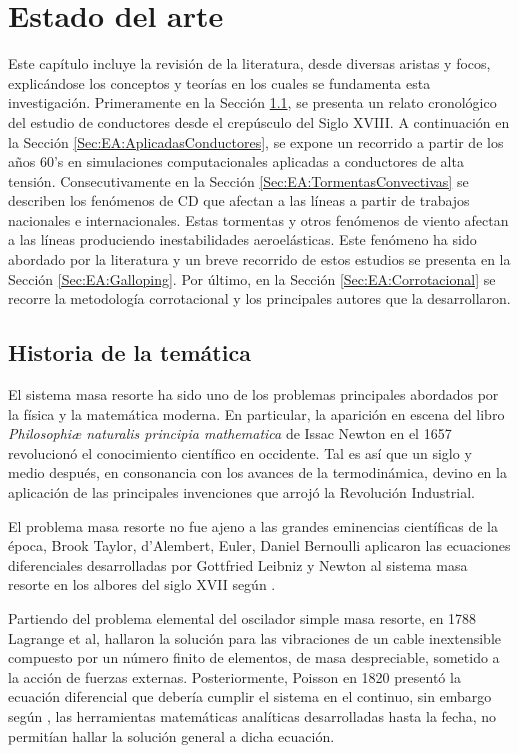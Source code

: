 \chapter{Estado del arte}\label{Cap:EstadoDelArte}\linenumbers

Este capítulo incluye la revisión de la literatura, desde diversas aristas y focos, explicándose los conceptos y teorías en los cuales se fundamenta esta investigación. Primeramente en la Sección \ref{Sec:EA:Historia}, se presenta un relato cronológico del estudio de conductores desde el crepúsculo del Siglo XVIII. A continuación en la Sección \ref{Sec:EA:AplicadasConductores}, se expone un recorrido a partir de los años 60's en simulaciones computacionales aplicadas a conductores de alta tensión. Consecutivamente en la Sección \ref{Sec:EA:TormentasConvectivas} se describen los fenómenos de CD que afectan a las líneas a partir de trabajos nacionales e internacionales. Estas tormentas y otros fenómenos de viento afectan a las líneas produciendo inestabilidades aeroelásticas. Este fenómeno ha sido abordado por la literatura y un breve recorrido de estos estudios se presenta en la Sección \ref{Sec:EA:Galloping}. Por último, en la Sección \ref{Sec:EA:Corrotacional} se recorre la metodología corrotacional y los principales autores que la desarrollaron. 

\section{Historia de la temática}\label{Sec:EA:Historia}
El sistema masa resorte ha sido uno de los problemas principales abordados por la física y la matemática moderna. En particular, la aparición en escena del libro \emph{Philosophiæ naturalis principia mathematica} de Issac Newton en el 1657 revolucionó el conocimiento científico en occidente. Tal es así que un siglo y medio después, en consonancia con los avances de la termodinámica, devino en la aplicación de las principales invenciones que arrojó la Revolución Industrial.

El problema masa resorte no fue ajeno a las grandes eminencias científicas de la época, Brook Taylor, d'Alembert, Euler, Daniel Bernoulli aplicaron las ecuaciones diferenciales desarrolladas por Gottfried Leibniz y Newton al sistema masa resorte en los albores del siglo XVII según \cite{Starossek1991}.  

Partiendo del problema elemental del oscilador simple masa resorte, en 1788 Lagrange et al, hallaron la solución para las vibraciones de un cable inextensible compuesto por un número finito de elementos, de masa despreciable, sometido a la acción de fuerzas externas. Posteriormente, Poisson en 1820 presentó la ecuación diferencial que debería cumplir el sistema en el continuo, sin embargo según \cite{Irvine1974}, las herramientas matemáticas analíticas desarrolladas hasta la fecha, no permitían hallar la solución general a dicha ecuación.

